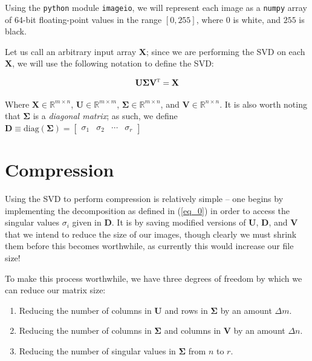 \documentclass[a4paper,10pt,english]{article}
\begin{document}
\begin{multicols*}{2}
Using the \texttt{python} module \texttt{imageio}, we will represent each image as a \texttt{numpy} array of 64-bit floating-point values in the range $[0, 255]$, where $0$ is white, and $255$ is black.  

Let us call an arbitrary input array $\mathbf{X}$; since we are performing the SVD on each $\mathbf{X}$, we will use the following notation to define the SVD:

\begin{equation}
\label{eq_0}
\mathbf{U} \mathbf{\Sigma} \mathbf{V}^\textsc{t} = \mathbf{X}
\end{equation}

Where $\mathbf{X} \in \mathbb{R}^{m \times n}$, $\mathbf{U} \in \mathbb{R}^{m \times m}$, $\mathbf{\Sigma} \in \mathbb{R}^{m \times n}$, and $\mathbf{V} \in \mathbb{R}^{n \times n}$.  It is also worth noting that $\mathbf{\Sigma}$ is a \textit{diagonal matrix}; as such, we define $\mathbf{D} \equiv \text{diag}({\mathbf{\Sigma}}) = \begin{bmatrix} \sigma_1 & \sigma_2 & \cdots & \sigma_r \end{bmatrix}$

\section*{Compression}

Using the SVD to perform compression is relatively simple – one begins by implementing the decomposition as defined in (\ref{eq_0}) in order to access the singular values $\sigma_i$ given in $\mathbf{D}$.  It is by saving modified versions of $\mathbf{U}$, $\mathbf{D}$, and $\mathbf{V}$ that we intend to reduce the size of our images, though clearly we must shrink them before this becomes worthwhile, as currently this would increase our file size!

To make this process worthwhile, we have three degrees of freedom by which we can reduce our matrix size:

\begin{enumerate}
\item Reducing the number of columns in $\mathbf{U}$ and rows in $\mathbf{\Sigma}$ by an amount $\Delta m$.
\item Reducing the number of columns in $\mathbf{\Sigma}$ and columns in $\mathbf{V}$ by an amount $\Delta n$.
\item Reducing the number of singular values in $\mathbf{\Sigma}$ from $n$ to $r$.
\end{enumerate}


\end{multicols*}
\end{document}
